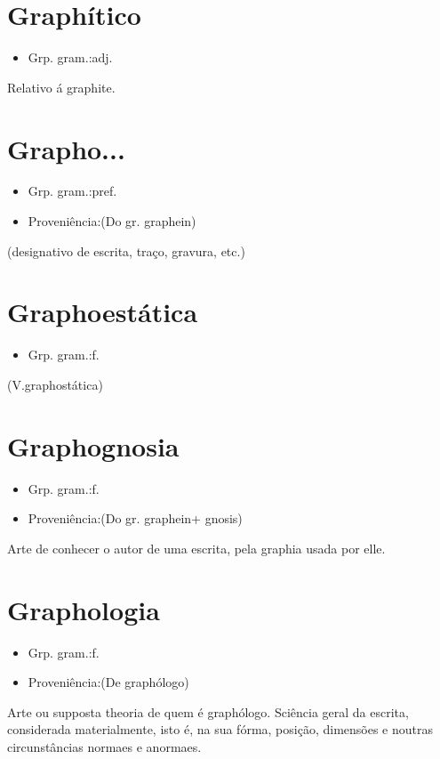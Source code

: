 \section{Graphítico}
\begin{itemize}
\item {Grp. gram.:adj.}
\end{itemize}
Relativo á graphite.
\section{Grapho...}
\begin{itemize}
\item {Grp. gram.:pref.}
\end{itemize}
\begin{itemize}
\item {Proveniência:(Do gr. \textunderscore graphein\textunderscore )}
\end{itemize}
(designativo de escrita, traço, gravura, etc.)
\section{Graphoestática}
\begin{itemize}
\item {Grp. gram.:f.}
\end{itemize}
(V.graphostática)
\section{Graphognosia}
\begin{itemize}
\item {Grp. gram.:f.}
\end{itemize}
\begin{itemize}
\item {Proveniência:(Do gr. \textunderscore graphein\textunderscore  + \textunderscore gnosis\textunderscore )}
\end{itemize}
Arte de conhecer o autor de uma escrita, pela graphia usada por elle.
\section{Graphologia}
\begin{itemize}
\item {Grp. gram.:f.}
\end{itemize}
\begin{itemize}
\item {Proveniência:(De \textunderscore graphólogo\textunderscore )}
\end{itemize}
Arte ou supposta theoria de quem é graphólogo.
Sciência geral da escrita, considerada materialmente, isto é, na sua fórma, posição, dimensões e noutras circunstâncias normaes e anormaes.
